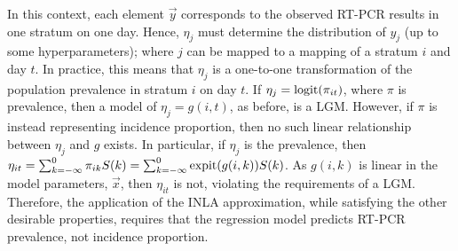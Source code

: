 \documentclass[thesis.tex]{subfiles}
\begin{document}
In this context, each element $\vec{y}$ corresponds to the observed RT-PCR results in one stratum on one day.
Hence, $\eta_{j}$ must determine the distribution of $y_{j}$ (up to some hyperparameters); where $j$ can be mapped to a mapping of a stratum $i$ and day $t$.
In practice, this means that $\eta_j$ is a one-to-one transformation of the population prevalence in stratum $i$ on day $t$.
If $\eta_j = \operatorname{logit}(\pi_{it})$, where $\pi$ is prevalence, then a model of $\eta_j = g(i, t)$, as before, is a LGM.
However, if $\pi$ is instead representing incidence proportion, then no such linear relationship between $\eta_j$ and $g$ exists.
In particular, if $\eta_j$ is the prevalence, then $\eta_{it} = \sum_{k=-\infty}^0 \pi_{ik} S(k) = \sum_{k=-\infty}^0 \operatorname{expit}(g(i, k)) S(k)$.
As $g(i, k)$ is linear in the model parameters, $\vec{x}$, then $\eta_{it}$ is not, violating the requirements of a LGM.
Therefore, the application of the INLA approximation, while satisfying the other desirable properties, requires that the regression model predicts RT-PCR prevalence, not incidence proportion.
\end{document}
